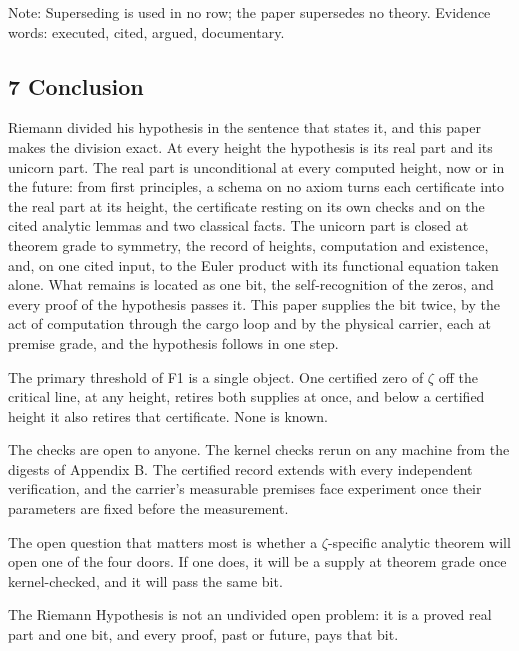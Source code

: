 \documentclass[10pt]{article}
\newenvironment{tnote}{\par\vspace{-2pt}\footnotesize\color{faint}\noindent}{\par\vspace{6pt}}
\begin{document}
\begin{tnote}

Note: Superseding is used in no row; the paper supersedes no theory.
Evidence words: executed, cited, argued, documentary.

\end{tnote}

\hypertarget{conclusion}{%
\subsection{7 Conclusion}\label{conclusion}}

Riemann divided his hypothesis in the sentence that states it, and this
paper makes the division exact. At every height the hypothesis is its
real part and its unicorn part. The real part is unconditional at every
computed height, now or in the future: from first principles, a schema
on no axiom turns each certificate into the real part at its height, the
certificate resting on its own checks and on the cited analytic lemmas
and two classical facts. The unicorn part is closed at theorem grade to
symmetry, the record of heights, computation and existence, and, on one
cited input, to the Euler product with its functional equation taken
alone. What remains is located as one bit, the self-recognition of the
zeros, and every proof of the hypothesis passes it. This paper supplies
the bit twice, by the act of computation through the cargo loop and by
the physical carrier, each at premise grade, and the hypothesis follows
in one step.

The primary threshold of F1 is a single object. One certified zero of
\(\zeta\) off the critical line, at any height, retires both supplies at
once, and below a certified height it also retires that certificate.
None is known.

The checks are open to anyone. The kernel checks rerun on any machine
from the digests of Appendix B. The certified record extends with every
independent verification, and the carrier's measurable premises face
experiment once their parameters are fixed before the measurement.

The open question that matters most is whether a \(\zeta\)-specific
analytic theorem will open one of the four doors. If one does, it will
be a supply at theorem grade once kernel-checked, and it will pass the
same bit.

The Riemann Hypothesis is not an undivided open problem: it is a proved
real part and one bit, and every proof, past or future, pays that bit.
\end{document}
